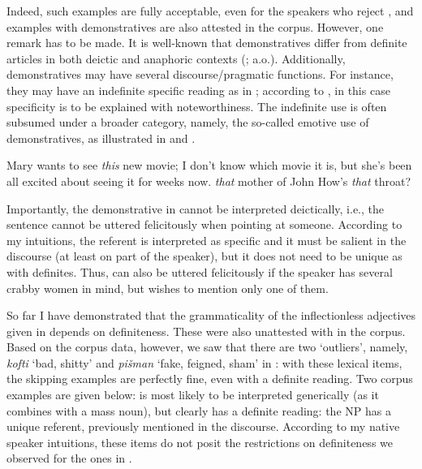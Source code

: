 \documentclass[output=paper]{langscibook}
\begin{document}
\noindent Indeed, such examples are fully acceptable, even for the speakers who reject , and examples with demonstratives are also attested in the corpus. However, one remark has to be made. It is well-known that demonstratives differ from definite articles in both deictic and anaphoric contexts (\citealt{Lyons1999,Wolter2006PhD}; a.o.). Additionally, demonstratives may have several discourse\slash pragmatic functions. For instance, they may have an indefinite specific reading as in ; according to \citet{Ionin2006}, in this case specificity is to be explained with noteworthiness. The indefinite use is often subsumed under a broader category, namely, the so-called emotive use of demonstratives, as illustrated in  and  \citep[see][]{Lakoff1974,Wolter2006PhD,PottsSchwarz2010}.


\ea 
\ea \label{ge-ex-thisindef}
Mary wants to see \emph{this} new movie; I don't know which movie it is, but she's been all excited about seeing it for weeks now. \hfill \citep{Ionin2006}
\ex \label{ge-ex-emotive} 
\emph{that} mother of John \hfill \citep{Lakoff1974}
\ex \label{ge-ex-emotive2} 
How's \emph{that} throat? \hfill \citep{Lakoff1974}
\z
\z

\noindent Importantly, the demonstrative in  cannot be interpreted deictically, i.e., the sentence cannot be uttered felicitously when pointing at someone. According to my intuitions, the referent is interpreted as specific and it must be salient in the discourse (at least on part of the speaker), but it does not need to be unique as with definites. Thus,  can also be uttered felicitously if the speaker has several crabby women in mind, but wishes to mention only one of them. 

So far I have demonstrated that the grammaticality of the inflectionless adjectives given in  depends on definiteness. These were also unattested with \Def{} in the corpus. Based on the corpus data, however, we saw that there are two `outliers', namely, \emph{kofti} `bad, shitty' and \emph{pi\v{s}man} `fake, feigned, sham' in : with these lexical items, the skipping examples are perfectly fine, even with a definite reading. Two corpus examples are given below:  is most likely to be interpreted generically (as it combines with a mass noun), but  clearly has a definite reading: the NP has a unique referent, previously mentioned in the discourse. According to my native speaker intuitions, these items do not posit the restrictions on definiteness we observed for the ones in .
\end{document}
